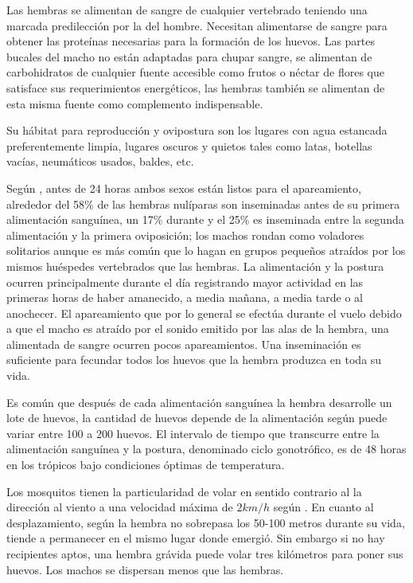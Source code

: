 Las hembras se alimentan de sangre de cualquier vertebrado teniendo una marcada predilección por la del hombre.
Necesitan alimentarse de sangre para obtener las proteínas necesarias para la formación de los huevos. Las partes
bucales del macho no están adaptadas para chupar sangre, se alimentan de carbohidratos de cualquier fuente
accesible como frutos o néctar de flores que satisface sus requerimientos energéticos, las hembras también se
alimentan de esta misma fuente como complemento indispensable\cite{ThironIzcazaJ2003}.

Su hábitat para reproducción y ovipostura son los lugares con agua estancada preferentemente limpia, lugares
oscuros y quietos tales como latas, botellas vacías, neumáticos usados, baldes, etc.

Según \cite{ThironIzcazaJ2003}, antes de 24 horas ambos sexos están listos para el apareamiento, alrededor del 
58\% de las hembras nulíparas son inseminadas antes de su primera alimentación sanguínea, un 17\% durante y el 
25\% es inseminada entre la segunda alimentación y la primera oviposición; los machos rondan como voladores
solitarios aunque es más común que lo hagan en grupos pequeños atraídos por los mismos huéspedes vertebrados 
que las hembras. La alimentación y la postura ocurren principalmente durante el día registrando mayor actividad
en las primeras horas de haber amanecido, a media mañana, a media tarde o al anochecer. El apareamiento que por
lo general se efectúa durante el vuelo debido a que el macho es atraído por el sonido emitido por las alas de la
hembra, una alimentada de sangre ocurren pocos apareamientos. Una inseminación es suficiente para fecundar todos
los huevos que la hembra produzca en toda su vida\cite{ThironIzcazaJ2003}. 

Es común que después de cada alimentación sanguínea la hembra desarrolle un lote de huevos, la cantidad de 
huevos depende de la alimentación según \cite{cabezas2005dengue} puede variar entre 100 a 200 huevos. El
intervalo de tiempo que transcurre entre la alimentación sanguínea y la postura, denominado ciclo gonotrófico, 
es de 48 horas en los trópicos bajo condiciones óptimas de temperatura\cite{ThironIzcazaJ2003}. 

Los mosquitos tienen la particularidad de volar en sentido contrario al la dirección al viento a una
velocidad máxima de $2 km/h$ según \cite{web-site:speedAnimals}. En cuanto al desplazamiento, según 
\cite{cabezas2005dengue} la hembra no sobrepasa los 50-100 metros durante su vida, tiende a permanecer en el
mismo lugar donde emergió. Sin embargo si no hay recipientes aptos, una hembra grávida puede volar tres
kilómetros para poner sus huevos. Los machos se dispersan menos que las hembras.


